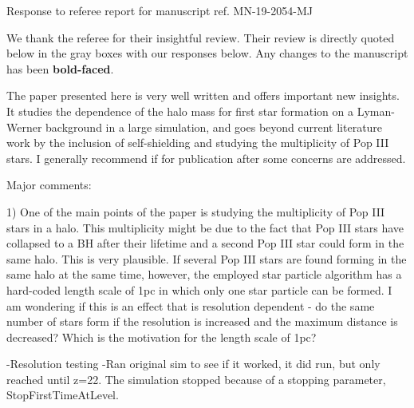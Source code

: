 \documentclass[11pt]{article}
\newenvironment{referee}[1][]{%
    \ignorespaces%
    \begin{mdframed}[style=myquotestyle,#1]%
}{%
    \end{mdframed}%
    \ignorespacesafterend%
}%
\begin{document}
\begin{center} 
\bfseries{
\begin{large}
  Response to referee report for manuscript ref. MN-19-2054-MJ
\end{large}
}
\end{center}

We thank the referee for their insightful review.  Their review is directly quoted below in the gray boxes with our responses below.  Any changes to the manuscript has been \textbf{bold-faced}.

\begin{referee}
The paper presented here is very well written and offers important new insights.  It studies the dependence of the halo mass for first star formation on a Lyman-Werner background in a large simulation, and goes beyond current literature work by the inclusion of self-shielding and studying the multiplicity of Pop III stars. I generally recommend if for publication after some concerns are addressed.
\end{referee}


\begin{referee}
Major comments:

1) One of the main points of the paper is studying the multiplicity of Pop III stars in a halo. This multiplicity might be due to the fact that Pop III stars have collapsed to a BH after their lifetime and a second Pop III star could form in the same halo. This is very plausible. If several Pop III stars are found forming in the same halo at the same time, however, the employed star particle algorithm has a hard-coded length scale of 1pc in which only one star particle can be formed. I am wondering if this is an effect that is resolution dependent - do the same number of stars form if the resolution is increased and the maximum distance is decreased? Which is the motivation for the length scale of 1pc?
\end{referee}

-Resolution testing
-Ran original sim to see if it worked, it did run, but only reached until z=22. The simulation stopped because of a stopping parameter, StopFirstTimeAtLevel. 
\end{document}
